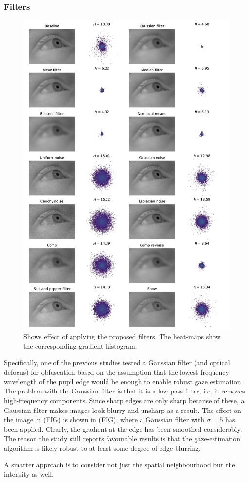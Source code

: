 \subsubsection{Filters}

\begin{figure}
    \centering
    \includegraphics[width=1\linewidth]{figures/filter_effect.pdf}
    \caption{Shows effect of applying the proposed filters. The heat-maps show the corresponding gradient histogram.}
    \label{fig:filters}
\end{figure}
Specifically, one of the previous studies tested a Gaussian filter (and optical defocus) \parencite{BRENDAN_BLUR} for obfuscation based on the assumption that the lowest frequency wavelength of the pupil edge would be enough to enable robust gaze estimation. The problem with the Gaussian filter is that it is a low-pass filter, i.e. it removes high-frequency components. Since sharp edges are only sharp because of these, a Gaussian filter makes images look blurry and unsharp as a result. The effect on the image in (FIG) is shown in (FIG), where a Gaussian filter with $\sigma=5$ has been applied. Clearly, the gradient at the edge has been smoothed considerably. The reason the study still reports favourable results is that the gaze-estimation algorithm is likely robust to at least some degree of edge blurring.

A smarter approach is to consider not just the spatial neighbourhood but the intensity as well. 